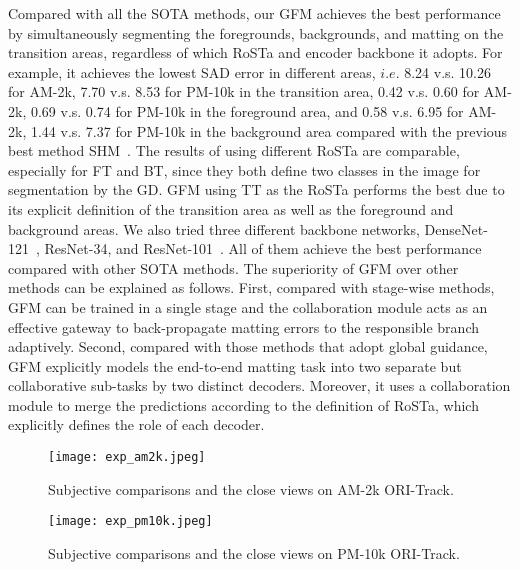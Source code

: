 \documentclass[twocolumn]{svjour3}
\begin{document}
Compared with all the SOTA methods, our GFM achieves the best performance by simultaneously segmenting the foregrounds, backgrounds, and matting on the transition areas, regardless of which RoSTa and encoder backbone it adopts. For example, it achieves the lowest SAD error in different areas, $i.e.$ 8.24 v.s. 10.26 for AM-2k, 7.70 v.s. 8.53 for PM-10k in the transition area, 0.42 v.s. 0.60 for AM-2k, 0.69 v.s. 0.74 for PM-10k in the foreground area, and 0.58 v.s. 6.95 for AM-2k, 1.44 v.s. 7.37 for PM-10k in the background area compared with the previous best method SHM~\citep{chen2018semantic}. The results of using different RoSTa are comparable, especially for FT and BT, since they both define two classes in the image for segmentation by the GD. GFM using TT as the RoSTa performs the best due to its explicit definition of the transition area as well as the foreground and background areas. We also tried three different backbone networks, DenseNet-121~\citep{huang2017densely}, ResNet-34, and ResNet-101~\citep{he2016deep}. All of them achieve the best performance compared with other SOTA methods. The superiority of GFM over other methods can be explained as follows. First, compared with stage-wise methods, GFM can be trained in a single stage and the collaboration module acts as an effective gateway to back-propagate matting errors to the responsible branch adaptively. Second, compared with those methods that adopt global guidance, GFM explicitly models the end-to-end matting task into two separate but collaborative sub-tasks by two distinct decoders. Moreover, it uses a collaboration module to merge the predictions according to the definition of RoSTa, which explicitly defines the role of each decoder. 


\begin{figure*}[!t]
\centering
\texttt{[image: exp\_am2k.jpeg]}
    \caption{Subjective comparisons and the close views on AM-2k ORI-Track.}
    \label{fig:am2k_visual}
\end{figure*}
\begin{figure*}[!t]
\centering
\texttt{[image: exp\_pm10k.jpeg]}
    \caption{Subjective comparisons and the close views on PM-10k ORI-Track.}
    \label{fig:pm10k_visual}
\end{figure*}
\end{document}
